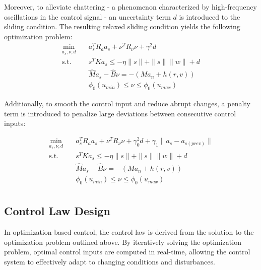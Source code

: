 Moreover, to alleviate chattering - a phenomenon characterized 
by high-frequency oscillations in the control signal - an uncertainty 
term $d$ is introduced to the sliding condition. The resulting relaxed 
sliding condition yields the following optimization problem:
\begin{equation}
\begin{aligned}
\min_{a_s, \nu, d} \quad & a_s^T R_a a_s + \nu^T R_\nu \nu + \gamma^2 d\\
\textrm{s.t.} \quad & s^TKa_s \leq -\eta \|s\| + \|s\|\|w\| + d\\
&\hat Ma_s - \hat B\nu = -(Ma_n + h(r, v)) \\
&\phi_0(u_{min}) \leq \nu \leq \phi_0(u_{max})
\end{aligned}
\end{equation}

Additionally, to smooth the control input and reduce abrupt changes, 
a penalty term is introduced to penalize large deviations between 
consecutive control inputs:

\begin{equation}
\begin{aligned}
\min_{a_s, \nu, d} \quad & a_s^T R_a a_s + \nu^T R_\nu \nu +
\gamma_0^2 d + \gamma_1 \|a_s - a_{s (prev)}\|\\
\textrm{s.t.} \quad & s^TKa_s \leq -\eta \|s\| + \|s\|\|w\| + d\\
&\hat Ma_s - \hat B\nu = -(Ma_n + h(r, v)) \\
&\phi_0(u_{min}) \leq \nu \leq \phi_0(u_{max}) \\
\end{aligned}
\end{equation}

\subsection{Control Law Design}

In optimization-based control, the control law is derived from 
the solution to the optimization problem outlined above. 
By iteratively solving the optimization problem, optimal control inputs 
are computed in real-time, allowing the control system to effectively 
adapt to changing conditions and disturbances.


